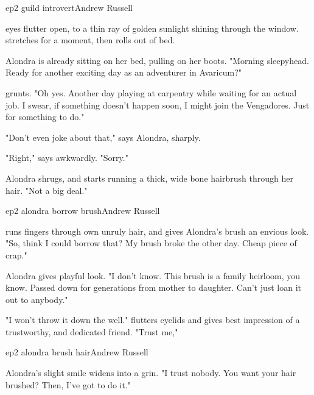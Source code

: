\documentclass{book}
\begin{document}
\begin{childnode}{ep2 guild introvert}{Andrew Russell}
    
    \names{} eyes flutter open, to a thin ray of golden sunlight shining through the window. \HeShe{} stretches for a moment, then rolls out of bed.

    Alondra is already sitting on her bed, pulling on her boots. "Morning sleepyhead. Ready for another exciting day as an adventurer in Avaricum?"

    \name{} grunts. "Oh yes. Another day playing at carpentry while waiting for an actual job. I swear, if something doesn't happen soon, I might join the Vengadores. Just for 
    something to do."

    "Don't even joke about that," says Alondra, sharply.

    "Right," says \name{} awkwardly. "Sorry."

    Alondra shrugs, and starts running a thick, wide bone hairbrush through her hair. "Not a big deal."


\end{childnode}

\begin{childnode}{ep2 alondra borrow brush}{Andrew Russell}

    \name{} runs \hisher{} fingers through \hisher{} own unruly hair, and gives Alondra's brush an envious look. "So, think I could borrow that? My brush broke the other day. Cheap piece of crap."

    Alondra gives \name{} playful look. "I don't know. This brush is a family heirloom, you know. Passed down for generations from mother to daughter. Can't just loan it out to anybody."

    "I won't throw it down the well." \name{} flutters \hisher{} eyelids and gives \hisher{} best impression of a trustworthy, and dedicated friend. "Trust me,"


\end{childnode}

\begin{childnode}{ep2 alondra brush hair}{Andrew Russell}

    Alondra's slight smile widens into a grin. "I trust nobody. You want your hair brushed? Then, I've got to do it."



    
\end{childnode}
\end{document}
